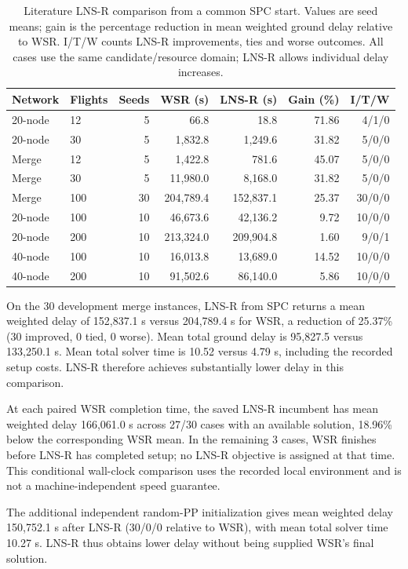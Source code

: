 \begin{table}[!htbp]
\centering\small
\caption{Literature LNS-R comparison from a common SPC start. Values are seed means; gain is the percentage reduction in mean weighted ground delay relative to WSR. I/T/W counts LNS-R improvements, ties and worse outcomes. All cases use the same candidate/resource domain; LNS-R allows individual delay increases.}\label{tab:lns}
\begin{tabular}{llrrrrr}
\toprule
Network & Flights & Seeds & WSR (s) & LNS-R (s) & Gain (\%) & I/T/W\\
\midrule
20-node & 12 & 5 & 66.8 & 18.8 & 71.86 & 4/1/0\\
20-node & 30 & 5 & 1,832.8 & 1,249.6 & 31.82 & 5/0/0\\
Merge & 12 & 5 & 1,422.8 & 781.6 & 45.07 & 5/0/0\\
Merge & 30 & 5 & 11,980.0 & 8,168.0 & 31.82 & 5/0/0\\
Merge & 100 & 30 & 204,789.4 & 152,837.1 & 25.37 & 30/0/0\\
20-node & 100 & 10 & 46,673.6 & 42,136.2 & 9.72 & 10/0/0\\
20-node & 200 & 10 & 213,324.0 & 209,904.8 & 1.60 & 9/0/1\\
40-node & 100 & 10 & 16,013.8 & 13,689.0 & 14.52 & 10/0/0\\
40-node & 200 & 10 & 91,502.6 & 86,140.0 & 5.86 & 10/0/0\\
\bottomrule
\end{tabular}
\end{table}

On the 30 development merge instances, LNS-R from SPC returns a mean weighted delay of 152,837.1 s versus 204,789.4 s for WSR, a reduction of 25.37\% (30 improved, 0 tied, 0 worse). Mean total ground delay is 95,827.5 versus 133,250.1 s. Mean total solver time is 10.52 versus 4.79 s, including the recorded setup costs. LNS-R therefore achieves substantially lower delay in this comparison.

At each paired WSR completion time, the saved LNS-R incumbent has mean weighted delay 166,061.0 s across 27/30 cases with an available solution, 18.96\% below the corresponding WSR mean. In the remaining 3 cases, WSR finishes before LNS-R has completed setup; no LNS-R objective is assigned at that time. This conditional wall-clock comparison uses the recorded local environment and is not a machine-independent speed guarantee.

The additional independent random-PP initialization gives mean weighted delay 150,752.1 s after LNS-R (30/0/0 relative to WSR), with mean total solver time 10.27 s. LNS-R thus obtains lower delay without being supplied WSR's final solution.


